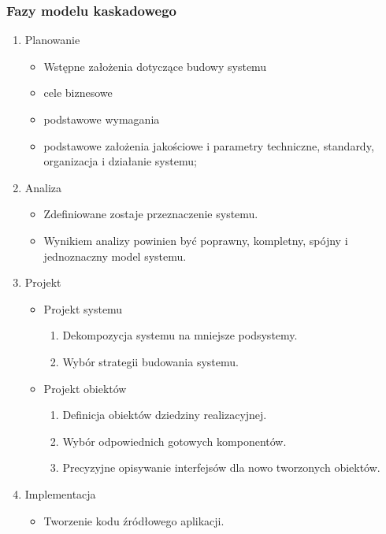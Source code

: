 \documentclass[12pt]{article}
\begin{document}
    \subsubsection{Fazy modelu kaskadowego}
    \begin{enumerate}
        \item Planowanie
        \begin{itemize}
            \item Wstępne założenia dotyczące budowy systemu
            \item cele biznesowe
            \item podstawowe wymagania
            \item podstawowe założenia jakościowe i parametry techniczne, standardy, organizacja i działanie systemu;
        \end{itemize}
        \item Analiza
        \begin{itemize}
            \item  Zdefiniowane zostaje przeznaczenie systemu.
            \item Wynikiem analizy powinien być poprawny, kompletny, spójny i jednoznaczny model systemu.
        \end{itemize}
        \item Projekt
        \begin{itemize}
            \item Projekt systemu
            \begin{enumerate}
                \item Dekompozycja systemu na mniejsze podsystemy.
                \item Wybór strategii budowania systemu.
            \end{enumerate}
            \item Projekt obiektów
            \begin{enumerate}
                \item Definicja obiektów dziedziny realizacyjnej.
                \item Wybór odpowiednich gotowych komponentów.
                \item Precyzyjne opisywanie interfejsów dla nowo tworzonych obiektów.
            \end{enumerate}
        \end{itemize}
        \item Implementacja
        \begin{itemize}
            \item Tworzenie kodu źródłowego aplikacji.

\end{itemize}
\end{enumerate}
\end{document}
